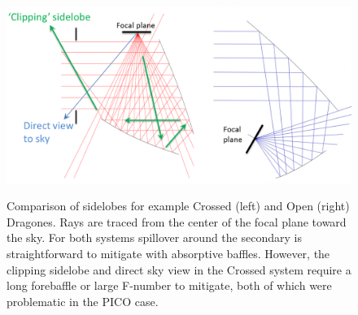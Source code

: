 \documentclass[]{spie}  %
\begin{document}
\begin{figure} [ht]
\begin{center}
\includegraphics[height=6.5cm]{sidelobes.png}
\end{center}
\caption { \label{fig:sidelobes} 
Comparison of sidelobes for example Crossed (left) and Open (right) Dragones.  Rays are traced from the center of the focal plane toward the sky.
For both systems spillover around the secondary is straightforward to mitigate with absorptive baffles.  However, the clipping sidelobe and direct 
sky view in the Crossed system require a long forebaffle or large F-number to mitigate, both of which were problematic in the PICO case.}
\end{figure} 
\end{document}
